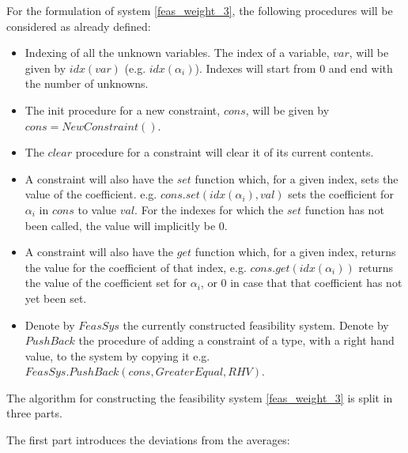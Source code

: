 \documentclass[a4paper,twoside,10pt]{report}
\begin{document}
	For the formulation of system \ref{feas_weight_3}, the following procedures will be considered as already defined:
	
	\begin{itemize}
		\item Indexing of all the unknown variables. The index of a variable, \(var\), will be given by \(idx(var)\) (e.g. \(idx(\alpha_i)\)). Indexes will start from 0 and end with the number of unknowns.
		\item The init procedure for a new constraint, \(cons\), will be given by \(cons = NewConstraint()\). 
		\item The \(clear\) procedure for a constraint will clear it of its current contents. 
		\item A constraint will also have the \(set\) function which, for a given index, sets the value of the coefficient. e.g. \(cons.set(idx(\alpha_i), val)\) sets the coefficient for \(\alpha_i\) in \(cons\) to value \(val\). For the indexes for which the \(set\) function has not been called, the value will implicitly be 0. 
		\item A constraint will also have the \(get\) function which, for a given index, returns the value for the coefficient of that index, e.g. \(cons.get(idx(\alpha_i))\) returns the value of the coefficient set for \(\alpha_i\), or 0 in case that that coefficient has not yet been set.
		\item Denote by \(FeasSys\) the currently constructed feasibility system. Denote by \(PushBack\) the procedure of adding a constraint of a type, with a right hand value, to the system by copying it e.g. \(FeasSys.PushBack(cons, GreaterEqual, RHV)\).
	\end{itemize}
	
	The algorithm for constructing the feasibility system \ref{feas_weight_3} is split in three parts.
	
	The first part introduces the deviations from the averages:	
	
\end{document}

